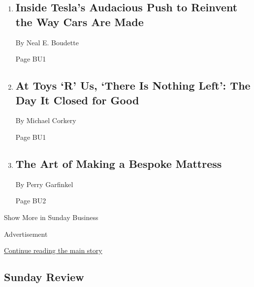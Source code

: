 \begin{enumerate}
\def\labelenumi{\arabic{enumi}.}
\item
  \href{/2018/06/30/business/tesla-factory-musk.html}{}

  \hypertarget{inside-teslas-audacious-push-to-reinvent-the-way-cars-are-made-1}{%
  \subsection{Inside Tesla's Audacious Push to Reinvent the Way Cars Are
  Made}\label{inside-teslas-audacious-push-to-reinvent-the-way-cars-are-made-1}}

  By Neal E. Boudette

  Page BU1
\item
  \href{/2018/06/30/business/toys-r-us-closing.html}{}

  \hypertarget{at-toys-r-us-there-is-nothing-left-the-day-it-closed-for-good-1}{%
  \subsection{At Toys `R' Us, `There Is Nothing Left': The Day It Closed
  for
  Good}\label{at-toys-r-us-there-is-nothing-left-the-day-it-closed-for-good-1}}

  By Michael Corkery

  Page BU1
\item
  \href{/2018/06/29/business/the-art-of-making-a-bespoke-mattress.html}{}

  \hypertarget{the-art-of-making-a-bespoke-mattress}{%
  \subsection{The Art of Making a Bespoke
  Mattress}\label{the-art-of-making-a-bespoke-mattress}}

  By Perry Garfinkel

  Page BU2
\end{enumerate}

Show More in Sunday Business

Advertisement

\protect\hyperlink{after-mid4}{Continue reading the main story}

\hypertarget{sunday-review}{%
\subsection{Sunday Review}\label{sunday-review}}

